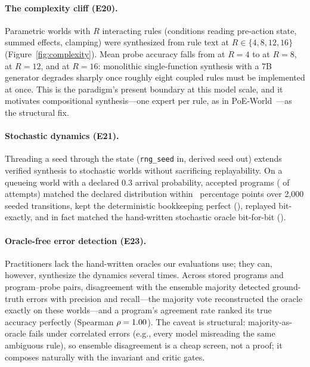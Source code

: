 \documentclass[11pt]{article}
\begin{document}
\paragraph{The complexity cliff (E20).} Parametric worlds with $R$
interacting rules (conditions reading pre-action state, summed effects,
clamping) were synthesized from rule text at $R \in \{4, 8, 12, 16\}$
(Figure~\ref{fig:complexity}). Mean probe accuracy falls from \CplxFour{} at
$R{=}4$ to \CplxEight{} at $R{=}8$, \CplxTwelve{} at $R{=}12$, and
\CplxSixteen{} at $R{=}16$: monolithic single-function synthesis with a 7B
generator degrades sharply once roughly eight coupled rules must be
implemented at once. This is the paradigm's present boundary at this model
scale, and it motivates compositional synthesis---one expert per rule, as in
PoE-World~\cite{poeworld2025}---as the structural fix.

\paragraph{Stochastic dynamics (E21).} Threading a seed through the state
(\texttt{rng\_seed} in, derived seed out) extends verified synthesis to
stochastic worlds without sacrificing replayability. On a queueing world
with a declared 0.3 arrival probability, accepted programs (\StochAccept{}
of attempts) matched the declared distribution within
\StochArrivalErr{}~percentage points over 2{,}000 seeded transitions, kept
the deterministic bookkeeping perfect (\StochDetAcc), replayed bit-exactly,
and in fact matched the hand-written stochastic oracle bit-for-bit
(\StochOracleExact).

\paragraph{Oracle-free error detection (E23).} Practitioners lack the
hand-written oracles our evaluations use; they can, however, synthesize the
dynamics several times. Across \SelfCheckPrograms{} stored programs and
\SelfCheckPairs{} program--probe pairs, disagreement with the ensemble
majority detected ground-truth errors with \SelfCheckPrecision{} precision
and \SelfCheckRecall{} recall---the majority vote reconstructed the oracle
exactly on these worlds---and a program's agreement rate ranked its true
accuracy perfectly (Spearman $\rho=1.00$). The caveat is
structural: majority-as-oracle fails under correlated errors (e.g., every
model misreading the same ambiguous rule), so ensemble disagreement is a
cheap screen, not a proof; it composes naturally with the invariant and
critic gates.
\end{document}
